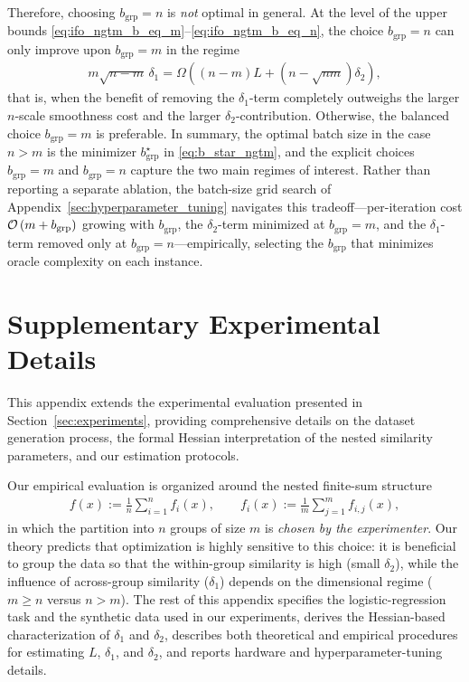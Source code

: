 \documentclass{article}
\newcommand{\cO}{{\cal O}}
\newcommand{\eqdef}{:=}
\newcommand{\rb}[1]{\left(#1\right)}
\theoremstyle{plain}
\begin{document}
Therefore, choosing $b_{\mathrm{grp}}=n$ is \emph{not} optimal in general. At the level of the upper bounds \eqref{eq:ifo_ngtm_b_eq_m}--\eqref{eq:ifo_ngtm_b_eq_n}, the choice $b_{\mathrm{grp}}=n$ can only improve upon $b_{\mathrm{grp}}=m$ in the regime
\begin{align*}
m\sqrt{n-m}\,\delta_1
=
\Omega\left(
(n-m)L + (n-\sqrt{nm})\delta_2
\right),
\end{align*}
that is, when the benefit of removing the $\delta_1$-term completely outweighs the larger $n$-scale smoothness cost and the larger $\delta_2$-contribution. Otherwise, the balanced choice $b_{\mathrm{grp}}=m$ is preferable. In summary, the optimal batch size in the case $n>m$ is the minimizer $b_{\mathrm{grp}}^\star$ in \eqref{eq:b_star_ngtm}, and the explicit choices $b_{\mathrm{grp}}=m$ and $b_{\mathrm{grp}}=n$ capture the two main regimes of interest. Rather than reporting a separate ablation, the batch-size grid search of Appendix~\ref{sec:hyperparameter_tuning} navigates this tradeoff---per-iteration cost $\cO\rb{m+b_{\mathrm{grp}}}$ growing with $b_{\mathrm{grp}}$, the $\delta_2$-term minimized at $b_{\mathrm{grp}}=m$, and the $\delta_1$-term removed only at $b_{\mathrm{grp}}=n$---empirically, selecting the $b_{\mathrm{grp}}$ that minimizes oracle complexity on each instance.


\newpage
\section{Supplementary Experimental Details}
\label{sec:experiments_similarity_logreg}

This appendix extends the experimental evaluation presented in Section~\ref{sec:experiments}, providing comprehensive details on the dataset generation process, the formal Hessian interpretation of the nested similarity parameters, and our estimation protocols.

Our empirical evaluation is organized around the nested finite-sum structure
\begin{align}
\label{eq:exp_dbl_sum}
f(x)\eqdef \frac{1}{n}\sum_{i=1}^n f_i(x),
\qquad
f_i(x)\eqdef \frac{1}{m}\sum_{j=1}^m f_{i,j}(x),
\end{align}
in which the partition into $n$ groups of size $m$ is \emph{chosen by the experimenter}. Our theory predicts that optimization is highly sensitive to this choice: it is beneficial to group the data so that the within-group similarity is high (small $\delta_2$), while the influence of across-group similarity ($\delta_1$) depends on the dimensional regime ($m \ge n$ versus $n > m$). The rest of this appendix specifies the logistic-regression task and the synthetic data used in our experiments, derives the Hessian-based characterization of $\delta_1$ and $\delta_2$, describes both theoretical and empirical procedures for estimating $L$, $\delta_1$, and $\delta_2$, and reports hardware and hyperparameter-tuning details.
\end{document}
